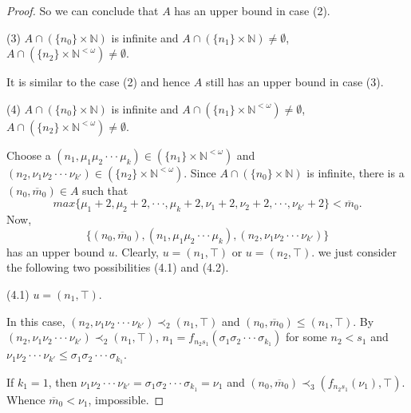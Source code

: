 \documentclass[preprint,12pt]{elsarticle}
\numberwithin{equation}{section}
\begin{document}
\begin{proof}
So we can conclude that $A$ has an upper bound in case (2).



(3) $A\cap(\{n_{0}\}\times\mathbb{N})$ is infinite and $A\cap(\{n_{1}\}\times\mathbb{N})\neq\emptyset$, $A\cap(\{n_{2}\}\times\mathbb{N}^{<\omega})\neq\emptyset$.

It is similar to the case (2) and hence $A$ still has an upper bound in case (3).

(4) $A\cap(\{n_{0}\}\times\mathbb{N})$ is infinite and $A\cap(\{n_{1}\}\times\mathbb{N}^{<\omega})\neq\emptyset$, $A\cap(\{n_{2}\}\times\mathbb{N}^{<\omega})\neq\emptyset$.

Choose a $(n_{1},\mu_{1}\mu_{2}\cdot\cdot\cdot\mu_{k})\in(\{n_{1}\}\times\mathbb{N}^{<\omega})$ and $(n_{2},\nu_{1}\nu_{2}\cdot\cdot\cdot\nu_{k'})\in(\{n_{2}\}\times\mathbb{N}^{<\omega})$. Since $A\cap(\{n_{0}\}\times\mathbb{N})$ is infinite, there is a $(n_{0},\overline{m}_{0})\in A$ such that $$max\{\mu_{1}+2,\mu_{2}+2,\cdot\cdot\cdot,\mu_{k}+2,\nu_{1}+2,\nu_{2}+2,\cdot\cdot\cdot,\nu_{k'}+2\}<\overline{m}_{0}.$$
Now, $$\{(n_{0},\overline{m}_{0}),(n_{1},\mu_{1}\mu_{2}\cdot\cdot\cdot\mu_{k}),(n_{2},\nu_{1}\nu_{2}\cdot\cdot\cdot\nu_{k'})\}$$ has an upper bound $u$. Clearly, $u=(n_{1},\top)$ or $u=(n_{2},\top)$. we just consider the following two possibilities (4.1) and (4.2).

(4.1) $u=(n_{1},\top)$.

In this case, $(n_{2},\nu_{1}\nu_{2}\cdot\cdot\cdot\nu_{k'})\prec_{2}(n_{1},\top)$ and $(n_{0},\overline{m}_{0})\leq(n_{1},\top)$. By $(n_{2},\nu_{1}\nu_{2}\cdot\cdot\cdot\nu_{k'})\prec_{2}(n_{1},\top)$, $n_{1}=f_{n_{2}s_{1}}(\sigma_{1}\sigma_{2}\cdot\cdot\cdot\sigma_{k_{1}})$ for some $n_{2}<s_{1}$ and $\nu_{1}\nu_{2}\cdot\cdot\cdot\nu_{k'}\leq\sigma_{1}\sigma_{2}\cdot\cdot\cdot\sigma_{k_{1}}$.

If $k_{1}=1$, then $\nu_{1}\nu_{2}\cdot\cdot\cdot\nu_{k'}=\sigma_{1}\sigma_{2}\cdot\cdot\cdot\sigma_{k_{1}}=\nu_{1}$ and $(n_{0},\overline{m}_{0})\prec_{3}(f_{n_{2}s_{1}}(\nu_{1}),\top)$. Whence $\overline{m}_{0}<\nu_{1}$, impossible.


\end{proof}
\end{document}
